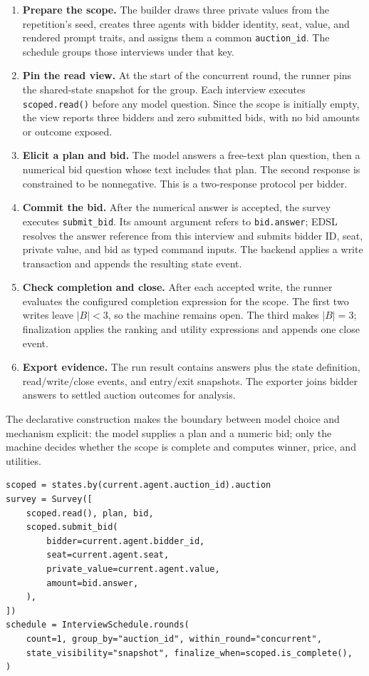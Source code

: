 \documentclass[11pt]{article}
\begin{document}
\begin{enumerate}
  \item \textbf{Prepare the scope.} The builder draws three private values from the repetition's seed, creates three agents with bidder identity, seat, value, and rendered prompt traits, and assigns them a common \texttt{auction\_id}. The schedule groups those interviews under that key.
  \item \textbf{Pin the read view.} At the start of the concurrent round, the runner pins the shared-state snapshot for the group. Each interview executes \texttt{scoped.read()} before any model question. Since the scope is initially empty, the view reports three bidders and zero submitted bids, with no bid amounts or outcome exposed.
  \item \textbf{Elicit a plan and bid.} The model answers a free-text plan question, then a numerical bid question whose text includes that plan. The second response is constrained to be nonnegative. This is a two-response protocol per bidder.
  \item \textbf{Commit the bid.} After the numerical answer is accepted, the survey executes \texttt{submit\_bid}. Its amount argument refers to \texttt{bid.answer}; EDSL resolves the answer reference from this interview and submits bidder ID, seat, private value, and bid as typed command inputs. The backend applies a write transaction and appends the resulting state event.
  \item \textbf{Check completion and close.} After each accepted write, the runner evaluates the configured completion expression for the scope. The first two writes leave $|B|<3$, so the machine remains open. The third makes $|B|=3$; finalization applies the ranking and utility expressions and appends one close event.
  \item \textbf{Export evidence.} The run result contains answers plus the state definition, read/write/close events, and entry/exit snapshots. The exporter joins bidder answers to settled auction outcomes for analysis.
\end{enumerate}

The declarative construction makes the boundary between model choice and mechanism explicit: the model supplies a plan and a numeric bid; only the machine decides whether the scope is complete and computes winner, price, and utilities.

\begin{lstlisting}[style=python]
scoped = states.by(current.agent.auction_id).auction
survey = Survey([
    scoped.read(), plan, bid,
    scoped.submit_bid(
        bidder=current.agent.bidder_id,
        seat=current.agent.seat,
        private_value=current.agent.value,
        amount=bid.answer,
    ),
])
schedule = InterviewSchedule.rounds(
    count=1, group_by="auction_id", within_round="concurrent",
    state_visibility="snapshot", finalize_when=scoped.is_complete(),
)
\end{lstlisting}
\end{document}
